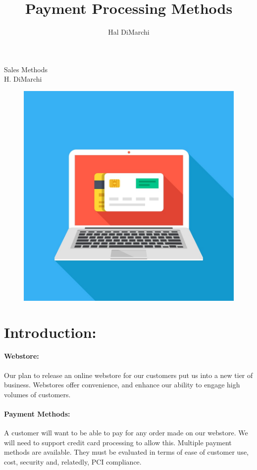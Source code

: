 \documentclass[letterpaper]{article}
\title{Payment Processing Methods}
\author{Hal DiMarchi}
\begin{document}
  \pagecolor{cyan!10}
  \begin{titlepage}
    \centering
    \vfill
    {\Large
        Sales Methods\\
        H. DiMarchi\\
    }
    \vfill
    \begin{figure}[h]
      \centering
      \includegraphics[width=12cm]{best-online-credit-card-processing}
    \end{figure}
  \end{titlepage}
  \tableofcontents
  \newpage
  \section{Introduction:}
    \paragraph{Webstore:}
    Our plan to release an online webstore for our customers put us into a new
    tier of business. Webstores offer convenience, and enhance
    our ability to engage high volumes of customers.
    \paragraph{Payment Methods:}
    A customer will want to be able to pay for any order made on our webstore. We will need to support
    credit card processing to allow this. Multiple payment methods are available. They must be evaluated
    in terms of ease of customer use, cost, security and, relatedly, PCI compliance.
\end{document}
